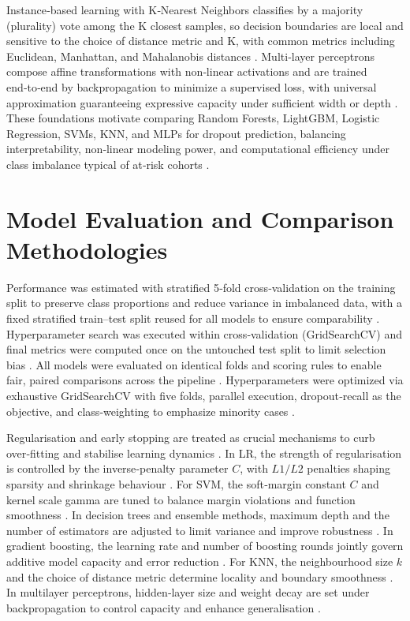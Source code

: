\documentclass[ %
                    author={Carlos Duran Calle},
                supervisor={Dr. Felipe Campelo},
                    degree={MSc},
                     title={Comparative Machine Learning Analysis for Student Dropout Prediction in a Virtual Learning Environment},
                  subtitle={Incorporating Student Engagement and Socio-Economic Features},
                      type={},
                      year={2025}]{dissertation}
\begin{document}
Instance‑based learning with K‑Nearest Neighbors classifies by a majority (plurality) vote among the K closest samples, so decision boundaries are local and sensitive to the choice of distance metric and K, with common metrics including Euclidean, Manhattan, and Mahalanobis distances \cite{cover_nearest_1967} \cite{aha_instance-based_1991}. Multi‑layer perceptrons compose affine transformations with non‑linear activations and are trained end‑to‑end by backpropagation to minimize a supervised loss, with universal approximation guaranteeing expressive capacity under sufficient width or depth \cite{rumelhart_learning_1986} \cite{hornik_multilayer_1989}. These foundations motivate comparing Random Forests, LightGBM, Logistic Regression, SVMs, KNN, and MLPs for dropout prediction, balancing interpretability, non‑linear modeling power, and computational efficiency under class imbalance typical of at‑risk cohorts \cite{krawczyk_learning_2016}.

\section{Model Evaluation and Comparison Methodologies}
Performance was estimated with stratified 5‑fold cross‑validation \cite{kohavi_study_1995} on the training split to preserve class proportions and reduce variance in imbalanced data, with a fixed stratified train–test split reused for all models to ensure comparability \cite{luque_impact_2019}. Hyperparameter search was executed within cross‑validation (GridSearchCV) and final metrics were computed once on the untouched test split to limit selection bias \cite{varma_bias_2006}. All models were evaluated on identical folds and scoring rules to enable fair, paired comparisons across the pipeline \cite{demsar_statistical_2006}. Hyperparameters were optimized via exhaustive GridSearchCV with five folds, parallel execution, dropout‑recall as the objective, and class‑weighting to emphasize minority cases \cite{kohavi_study_1995} \cite{krawczyk_learning_2016}.

Regularisation and early stopping are treated as crucial mechanisms to curb over‑fitting and stabilise learning dynamics \cite{prechelt_early_2012}. In LR, the strength of regularisation is controlled by the inverse‑penalty parameter $C$, with $L1/L2$ penalties shaping sparsity and shrinkage behaviour \cite{ng_feature_2004}. For SVM, the soft‑margin constant $C$ and kernel scale gamma are tuned to balance margin violations and function smoothness \cite{cortes_svm_1995}. In decision trees and ensemble methods, maximum depth and the number of estimators are adjusted to limit variance and improve robustness \cite{breiman_rf_2001}. In gradient boosting, the learning rate and number of boosting rounds jointly govern additive model capacity and error reduction \cite{friedman_gbm_2001}. For KNN, the neighbourhood size $k$ and the choice of distance metric determine locality and boundary smoothness \cite{cover_nearest_1967}. In multilayer perceptrons, hidden‑layer size and weight decay are set under backpropagation to control capacity and enhance generalisation \cite{krogh_simple_1991}. 
\end{document}
